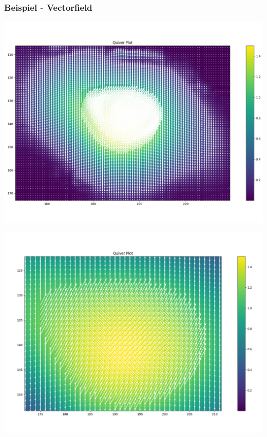 \begin{frame}
	\frametitle{Beispiel - Vectorfield}
	\begin{minipage}{0.49\textwidth}
		\includegraphics[width=\linewidth]{../Pictures/preferred_1_zoom.png}
	\end{minipage}
	\begin{minipage}{0.49\textwidth}
		\includegraphics[width=\linewidth]{../Pictures/preferred_1_zoom2.png}
	\end{minipage}
\end{frame}

